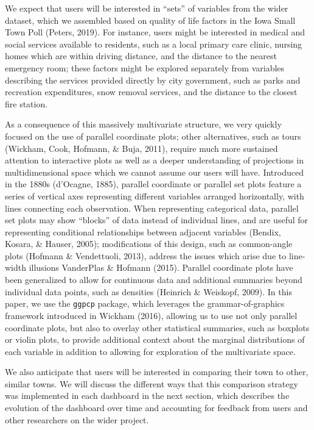 \documentclass[print]{nuthesis}
\begin{document}
We expect that users will be interested in ``sets'' of variables from the wider dataset, which we assembled based on quality of life factors in the Iowa Small Town Poll (Peters, 2019). For instance, users might be interested in medical and social services available to residents, such as a local primary care clinic, nursing homes which are within driving distance, and the distance to the nearest emergency room; these factors might be explored separately from variables describing the services provided directly by city government, such as parks and recreation expenditures, snow removal services, and the distance to the closest fire station.

As a consequence of this massively multivariate structure, we very quickly focused on the use of parallel coordinate plots; other alternatives, such as tours (Wickham, Cook, Hofmann, \& Buja, 2011), require much more sustained attention to interactive plots as well as a deeper understanding of projections in multidimensional space which we cannot assume our users will have. Introduced in the 1880s (d'Ocagne, 1885), parallel coordinate or parallel set plots feature a series of vertical axes representing different variables arranged horizontally, with lines connecting each observation. When representing categorical data, parallel set plots may show ``blocks'' of data instead of individual lines, and are useful for representing conditional relationships between adjacent variables (Bendix, Kosara, \& Hauser, 2005); modifications of this design, such as common-angle plots (Hofmann \& Vendettuoli, 2013), address the issues which arise due to line-width illusions VanderPlas \& Hofmann (2015). Parallel coordinate plots have been generalized to allow for continuous data and additional summaries beyond individual data points, such as densities (Heinrich \& Weiskopf, 2009). In this paper, we use the \texttt{ggpcp} package, which leverages the grammar-of-graphics framework introduced in Wickham (2016), allowing us to use not only parallel coordinate plots, but also to overlay other statistical summaries, such as boxplots or violin plots, to provide additional context about the marginal distributions of each variable in addition to allowing for exploration of the multivariate space.

We also anticipate that users will be interested in comparing their town to other, similar towns. We will discuss the different ways that this comparison strategy was implemented in each dashboard in the next section, which describes the evolution of the dashboard over time and accounting for feedback from users and other researchers on the wider project.
\end{document}
